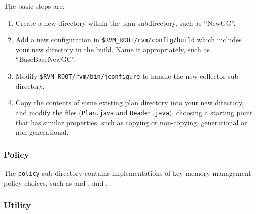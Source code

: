 The basic steps are:

\begin{enumerate}
\item Create a new directory within the plan subdirectory, such as
  ``NewGC''.
\item Add a new configuration in \texttt{\$RVM\_ROOT/rvm/config/build}
  which includes your new directory in the build.  Name it
  appropriately, such as ``BaseBaseNewGC''.
\item Modify \texttt{\$RVM\_ROOT/rvm/bin/jconfigure} to handle the new
  collector sub-directory.
\item Copy the contents of some existing plan directory into your new
  directory, and modify the files (\texttt{Plan.java} and
  \texttt{Header.java}), choosing a starting point that has similar
  properties, such as copying or non-copying, generational or
  non-generational.
\end{enumerate}

\subsubsection{Policy} \label{sssec:policy}

The \texttt{policy} sub-directory contains implementations of key
memory management policy choices, such as  and ,  and .

\subsubsection{Utility} \label{sssec:utility}

